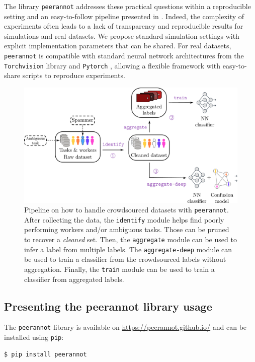 The library \texttt{peerannot} addresses these practical questions within a reproducible setting and an easy-to-follow pipeline presented in . Indeed, the complexity of experiments often leads to a lack of transparency and reproducible results for simulations and real datasets.
We propose standard simulation settings with explicit implementation parameters that can be shared.
For real datasets, \texttt{peerannot} is compatible with standard neural network architectures from the \texttt{Torchvision} \citep{torchvision} library and \texttt{Pytorch} \citep{pytorch}, allowing a flexible framework with easy-to-share scripts to reproduce experiments.

\begin{figure}[ht]
        \centering
        \includegraphics[width=\textwidth]{chapters/images/strategies_crowd_data.pdf}
        \caption{Pipeline on how to handle crowdsourced datasets with \texttt{peerannot}. After collecting the data, the \texttt{identify} module helps find poorly performing workers and/or ambiguous tasks. Those can be pruned to recover a \emph{cleaned} set. Then, the \texttt{aggregate} module can be used to infer a label from multiple labels. The \texttt{aggregate-deep} module can be used to train a classifier from the crowdsourced labels without aggregation. Finally, the \texttt{train} module can be used to train a classifier from aggregated labels.}
        \label{fig:pipeline_crowdsourcing_peerannot}
    \end{figure}

\subsection{Presenting the peerannot library usage}

The \texttt{peerannot} library is available on \url{https://peerannot.github.io/} and can be installed using \texttt{pip}:
\begin{verbatim}
$ pip install peerannot
\end{verbatim}

